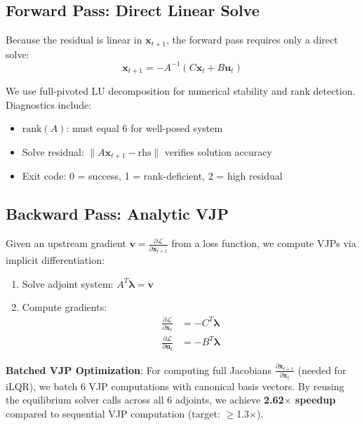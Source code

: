 \documentclass[conference]{IEEEtran}
\begin{document}
\subsection{Forward Pass: Direct Linear Solve}

Because the residual is linear in $\mathbf{x}_{t+1}$, the forward pass requires only a direct solve:
\begin{equation}
\mathbf{x}_{t+1} = -A^{-1}(C \mathbf{x}_t + B \mathbf{u}_t)
\end{equation}

We use full-pivoted LU decomposition for numerical stability and rank detection. Diagnostics include:
\begin{itemize}
\item $\text{rank}(A)$: must equal 6 for well-posed system
\item Solve residual: $\|A \mathbf{x}_{t+1} - \text{rhs}\|$ verifies solution accuracy
\item Exit code: 0 = success, 1 = rank-deficient, 2 = high residual
\end{itemize}

\subsection{Backward Pass: Analytic VJP}

Given an upstream gradient $\mathbf{v} = \frac{\partial \mathcal{L}}{\partial \mathbf{x}_{t+1}}$ from a loss function, we compute VJPs via implicit differentiation:
\begin{enumerate}
\item Solve adjoint system: $A^T \boldsymbol{\lambda} = \mathbf{v}$
\item Compute gradients:
\begin{align}
\frac{\partial \mathcal{L}}{\partial \mathbf{x}_t} &= -C^T \boldsymbol{\lambda} \\
\frac{\partial \mathcal{L}}{\partial \mathbf{u}_t} &= -B^T \boldsymbol{\lambda}
\end{align}
\end{enumerate}

\textbf{Batched VJP Optimization}: For computing full Jacobians $\frac{\partial \mathbf{x}_{t+1}}{\partial \mathbf{x}_t}$ (needed for iLQR), we batch 6 VJP computations with canonical basis vectors. By reusing the equilibrium solver calls across all 6 adjoints, we achieve \textbf{2.62$\times$ speedup} compared to sequential VJP computation (target: $\geq$1.3$\times$).
\end{document}
